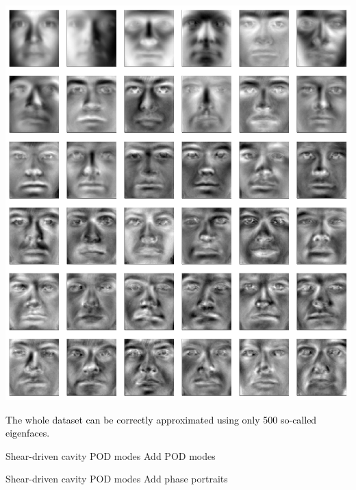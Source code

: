 \documentclass[aspectratio=169, usenames, dvipsnames]{beamer}
\begin{document}
{

\begin{frame}
  \vfill

  \begin{minipage}{.58\textwidth}
    \centering
    \includegraphics[height=.95\textheight]{leading_eigenfaces}
  \end{minipage}%
  \hfill
  \begin{minipage}{.38\textwidth}
    \textcolor{black}{
    The whole dataset can be correctly approximated using only 500 so-called eigenfaces.
    }
  \end{minipage}
  \vfill
\end{frame}

}
\begin{frame}{Shear-driven cavity POD modes}
  Add POD modes
\end{frame}

\begin{frame}{Shear-driven cavity POD modes}
  Add phase portraits
\end{frame}
\end{document}
